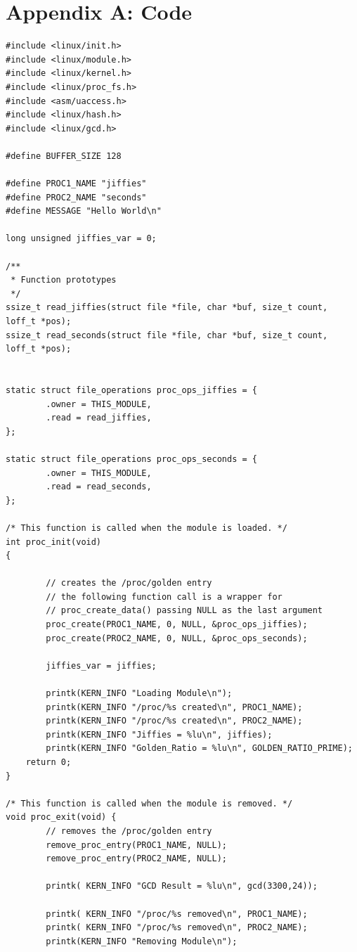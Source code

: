 \documentclass[10pt]{article}
\begin{document}
\section{Appendix A: Code}
\begin{verbatim}
#include <linux/init.h>
#include <linux/module.h>
#include <linux/kernel.h>
#include <linux/proc_fs.h>
#include <asm/uaccess.h>
#include <linux/hash.h>
#include <linux/gcd.h>

#define BUFFER_SIZE 128

#define PROC1_NAME "jiffies"
#define PROC2_NAME "seconds"
#define MESSAGE "Hello World\n"

long unsigned jiffies_var = 0;

/**
 * Function prototypes
 */
ssize_t read_jiffies(struct file *file, char *buf, size_t count, loff_t *pos);
ssize_t read_seconds(struct file *file, char *buf, size_t count, loff_t *pos);


static struct file_operations proc_ops_jiffies = {
        .owner = THIS_MODULE,
        .read = read_jiffies,
};

static struct file_operations proc_ops_seconds = {
        .owner = THIS_MODULE,
        .read = read_seconds,
};

/* This function is called when the module is loaded. */
int proc_init(void)
{

        // creates the /proc/golden entry
        // the following function call is a wrapper for
        // proc_create_data() passing NULL as the last argument
        proc_create(PROC1_NAME, 0, NULL, &proc_ops_jiffies);
        proc_create(PROC2_NAME, 0, NULL, &proc_ops_seconds);

        jiffies_var = jiffies;

        printk(KERN_INFO "Loading Module\n");
        printk(KERN_INFO "/proc/%s created\n", PROC1_NAME);
        printk(KERN_INFO "/proc/%s created\n", PROC2_NAME);
        printk(KERN_INFO "Jiffies = %lu\n", jiffies);
        printk(KERN_INFO "Golden_Ratio = %lu\n", GOLDEN_RATIO_PRIME);
	return 0;
}

/* This function is called when the module is removed. */
void proc_exit(void) {
        // removes the /proc/golden entry
        remove_proc_entry(PROC1_NAME, NULL);
        remove_proc_entry(PROC2_NAME, NULL);

        printk( KERN_INFO "GCD Result = %lu\n", gcd(3300,24));

        printk( KERN_INFO "/proc/%s removed\n", PROC1_NAME);
        printk( KERN_INFO "/proc/%s removed\n", PROC2_NAME);
        printk(KERN_INFO "Removing Module\n");


\end{verbatim}
\end{document}
